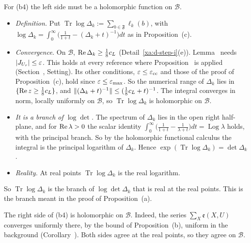 \begin{detail}
\begin{step}
For (b4) the left side must be a holomorphic function on $\mathcal B$.
\begin{itemize}
\item \emph{Definition.} Put $\operatorname{Tr}\log\Delta_k:=\sum_{b\in\mathfrak F}\ell_k(b)$, with $\log\Delta_k=\int_0^\infty\big(\frac1{1+t}-(\Delta_k+t)^{-1}\big)dt$ as in Proposition~(c).
\item \emph{Convergence.} On $\mathcal B$, $\operatorname{Re}\Delta_k\ge\frac18c_L$ (Detail~\ref{xa:d-step-i}(e)). Lemma~ needs $\lvert J_{U_r}\rvert\le\varepsilon$. This holds at every reference where Proposition~ is applied (Section~, Setting). Its other conditions, $\varepsilon\le\varepsilon_{\rm cc}$ and those of the proof of Proposition~(c), hold since $\varepsilon\le\varepsilon_{\max}$. So the numerical range of $\Delta_k$ lies in $\{\operatorname{Re} z\ge\frac18c_L\}$, and $\lVert(\Delta_k+t)^{-1}\rVert\le(\frac18c_L+t)^{-1}$. The integral converges in norm, locally uniformly on $\mathcal B$, so $\operatorname{Tr}\log\Delta_k$ is holomorphic on $\mathcal B$.
\item \emph{It is a branch of $\log\det$.} The spectrum of $\Delta_k$ lies in the open right half-plane, and for $\operatorname{Re}\lambda>0$ the scalar identity $\int_0^\infty\big(\frac1{1+t}-\frac1{\lambda+t}\big)dt=\operatorname{Log}\lambda$ holds, with the principal branch. So by the holomorphic functional calculus the integral is the principal logarithm of $\Delta_k$. Hence $\exp(\operatorname{Tr}\log\Delta_k)=\det\Delta_k$.
\item \emph{Reality.} At real points $\operatorname{Tr}\log\Delta_k$ is the real logarithm.
\end{itemize}
So $\operatorname{Tr}\log\Delta_k$ is the branch of $\log\det\Delta_k$ that is real at the real points. This is the branch meant in the proof of Proposition~(a).

The right side of (b4) is holomorphic on $\mathcal B$. Indeed, the series $\sum_X\mathfrak e(X,U)$ converges uniformly there, by the bound of Proposition~(b), uniform in the background (Corollary~). Both sides agree at the real points, so they agree on $\mathcal B$.
\end{step}


\end{detail}
